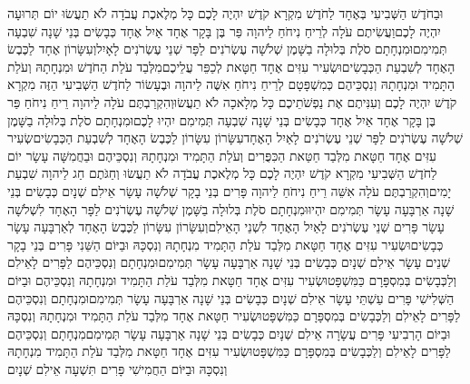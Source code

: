 \documentclass[../main/main.tex]{subfiles}
\begin{document}
\begin{multicols*}{\ncols}
וּבַחֹדֶשׁ הַשְּׁבִיעִי בְּאֶחָד לַחֹדֶשׁ מִקְרָא קֹדֶשׁ יִהְיֶה לָכֶם כָּל מְלֶאכֶת עֲבֹדָה לֹא תַעֲשׂוּ יוֹם תְּרוּעָה יִהְיֶה לָכֶם\PreVerseSpace{}וַעֲשִׂיתֶם עֹלָה לְרֵיחַ נִיחֹחַ לַיהוָה פַּר בֶּן בָּקָר אֶחָד אַיִל אֶחָד כְּבָשִׂים בְּנֵי שָׁנָה שִׁבְעָה תְּמִימִם\PreVerseSpace{}וּמִנְחָתָם סֹלֶת בְּלוּלָה בַשָּׁמֶן שְׁלֹשָׁה עֶשְׂרֹנִים לַפָּר שְׁנֵי עֶשְׂרֹנִים לָאָיִל\PreVerseSpace{}וְעִשָּׂרוֹן אֶחָד לַכֶּבֶשׂ הָאֶחָד לְשִׁבְעַת הַכְּבָשִׂים\PreVerseSpace{}וּשְׂעִיר עִזִּים אֶחָד חַטָּאת לְכַפֵּר עֲלֵיכֶם\PreVerseSpace{}מִלְּבַד עֹלַת הַחֹדֶשׁ וּמִנְחָתָהּ וְעֹלַת הַתָּמִיד וּמִנְחָתָהּ וְנִסְכֵּיהֶם כְּמִשְׁפָּטָם לְרֵיחַ נִיחֹחַ אִשֶּׁה לַיהוָה \ClosedSection{}וּבֶעָשׂוֹר לַחֹדֶשׁ הַשְּׁבִיעִי הַזֶּה מִקְרָא קֹדֶשׁ יִהְיֶה לָכֶם וְעִנִּיתֶם אֶת נַפְשֹׁתֵיכֶם כָּל מְלָאכָה לֹא תַעֲשׂוּ\PreVerseSpace{}וְהִקְרַבְתֶּם עֹלָה לַיהוָה רֵיחַ נִיחֹחַ פַּר בֶּן בָּקָר אֶחָד אַיִל אֶחָד כְּבָשִׂים בְּנֵי שָׁנָה שִׁבְעָה תְּמִימִם יִהְיוּ לָכֶם\PreVerseSpace{}וּמִנְחָתָם סֹלֶת בְּלוּלָה בַשָּׁמֶן שְׁלֹשָׁה עֶשְׂרֹנִים לַפָּר שְׁנֵי עֶשְׂרֹנִים לָאַיִל הָאֶחָד\PreVerseSpace{}עִשָּׂרוֹן עִשָּׂרוֹן לַכֶּבֶשׂ הָאֶחָד לְשִׁבְעַת הַכְּבָשִׂים\PreVerseSpace{}שְׂעִיר עִזִּים אֶחָד חַטָּאת מִלְּבַד חַטַּאת הַכִּפֻּרִים וְעֹלַת הַתָּמִיד וּמִנְחָתָהּ וְנִסְכֵּיהֶם \ClosedSection{}וּבַחֲמִשָּׁה עָשָׂר יוֹם לַחֹדֶשׁ הַשְּׁבִיעִי מִקְרָא קֹדֶשׁ יִהְיֶה לָכֶם כָּל מְלֶאכֶת עֲבֹדָה לֹא תַעֲשׂוּ וְחַגֹּתֶם חַג לַיהוָה שִׁבְעַת יָמִים\PreVerseSpace{}וְהִקְרַבְתֶּם עֹלָה אִשֵּׁה רֵיחַ נִיחֹחַ לַיהוָה פָּרִים בְּנֵי בָקָר שְׁלֹשָׁה עָשָׂר אֵילִם שְׁנָיִם כְּבָשִׂים בְּנֵי שָׁנָה אַרְבָּעָה עָשָׂר תְּמִימִם יִהְיוּ\PreVerseSpace{}וּמִנְחָתָם סֹלֶת בְּלוּלָה בַשָּׁמֶן שְׁלֹשָׁה עֶשְׂרֹנִים לַפָּר הָאֶחָד לִשְׁלֹשָׁה עָשָׂר פָּרִים שְׁנֵי עֶשְׂרֹנִים לָאַיִל הָאֶחָד לִשְׁנֵי הָאֵילִם\PreVerseSpace{}וְעִשָּׂרוֹן עִשָּׂרוֹן לַכֶּבֶשׂ הָאֶחָד לְאַרְבָּעָה עָשָׂר כְּבָשִׂים\PreVerseSpace{}וּשְׂעִיר עִזִּים אֶחָד חַטָּאת מִלְּבַד עֹלַת הַתָּמִיד מִנְחָתָהּ וְנִסְכָּהּ \ClosedSection{}וּבַיּוֹם הַשֵּׁנִי פָּרִים בְּנֵי בָקָר שְׁנֵים עָשָׂר אֵילִם שְׁנָיִם כְּבָשִׂים בְּנֵי שָׁנָה אַרְבָּעָה עָשָׂר תְּמִימִם\PreVerseSpace{}וּמִנְחָתָם וְנִסְכֵּיהֶם לַפָּרִים לָאֵילִם וְלַכְּבָשִׂים בְּמִסְפָּרָם כַּמִּשְׁפָּט\PreVerseSpace{}וּשְׂעִיר עִזִּים אֶחָד חַטָּאת מִלְּבַד עֹלַת הַתָּמִיד וּמִנְחָתָהּ וְנִסְכֵּיהֶם \ClosedSection{}וּבַיּוֹם הַשְּׁלִישִׁי פָּרִים עַשְׁתֵּי עָשָׂר אֵילִם שְׁנָיִם כְּבָשִׂים בְּנֵי שָׁנָה אַרְבָּעָה עָשָׂר תְּמִימִם\PreVerseSpace{}וּמִנְחָתָם וְנִסְכֵּיהֶם לַפָּרִים לָאֵילִם וְלַכְּבָשִׂים בְּמִסְפָּרָם כַּמִּשְׁפָּט\PreVerseSpace{}וּשְׂעִיר חַטָּאת אֶחָד מִלְּבַד עֹלַת הַתָּמִיד וּמִנְחָתָהּ וְנִסְכָּהּ \ClosedSection{}וּבַיּוֹם הָרְבִיעִי פָּרִים עֲשָׂרָה אֵילִם שְׁנָיִם כְּבָשִׂים בְּנֵי שָׁנָה אַרְבָּעָה עָשָׂר תְּמִימִם\PreVerseSpace{}מִנְחָתָם וְנִסְכֵּיהֶם לַפָּרִים לָאֵילִם וְלַכְּבָשִׂים בְּמִסְפָּרָם כַּמִּשְׁפָּט\PreVerseSpace{}וּשְׂעִיר עִזִּים אֶחָד חַטָּאת מִלְּבַד עֹלַת הַתָּמִיד מִנְחָתָהּ וְנִסְכָּהּ \ClosedSection{}וּבַיּוֹם הַחֲמִישִׁי פָּרִים תִּשְׁעָה אֵילִם שְׁנָיִם 
\end{multicols*}
\end{document}

